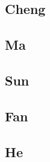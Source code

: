 \documentclass[11pt]{article}
\begin{document}
\cite{Star}

\subsection{Cheng}

\cite{Cheng}

\subsection{Ma}

\cite{Ma}

\subsection{Sun}

\cite{Sun}

\subsection{Fan}

\cite{Fan}

\subsection{He}

\cite{He}



\end{document}
